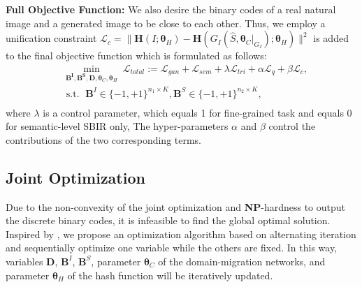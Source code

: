 \documentclass[runningheads]{llncs}
\newcommand{\st}{{\,\,\mathrm{s.t.\,\,}}}
\begin{document}
\noindent\textbf{Full Objective Function:} We also desire the binary codes of a real natural image and a generated image to be close to each other. Thus, we employ a unification constraint $\mathcal{L}_{c} =  \|  \mathbf{H} ( I ;\bm{\theta}_H ) -\mathbf{H} (G_I ( \hat{S}, \bm{\theta}_C|_{G_I} );\bm{\theta}_H   )  \|^2$ is added to the final objective function which is formulated as follows:
\begin{equation}\label{eq:equiv7}
\begin{split}
&\min_{\mathbf{B^I,B^S, D}, \bm{\theta}_C, \bm{\theta}_H}\;\mathcal{L}_{total} := \mathcal{L}_{gan}+\mathcal{L}_{sem}+ \lambda\mathcal{L}_{tri}+ \alpha\mathcal{L}_{q}+ \beta\mathcal{L}_{c}, \\
&\st \; \mathbf{B}^I  \in\{-1,+1\}^{n_1 \times K}, \mathbf{B}^S  \in\{-1,+1\}^{n_2 \times K},\\
\end{split}
\end{equation}
where $\lambda$ is a control parameter, which equals 1 for fine-grained task and equals 0 for semantic-level SBIR only, The hyper-parameters $\alpha$ and $\beta$ control the contributions of the two corresponding terms.


\subsection{Joint Optimization}
Due to the non-convexity of the joint optimization and \textbf{NP}-hardness to output the discrete binary codes, it is infeasible to find the global optimal solution. Inspired by \cite{GuiLSTT18}, we propose an  optimization algorithm  based on alternating iteration and sequentially optimize one variable while the others are fixed. In this way, variables $\mathbf{D}$, $\mathbf{B}^I$, $\mathbf{B}^S$, parameter $\bm{\theta}_C$ of the domain-migration networks, and parameter $\bm{\theta}_H$ of the hash function will be iteratively updated.
\end{document}
